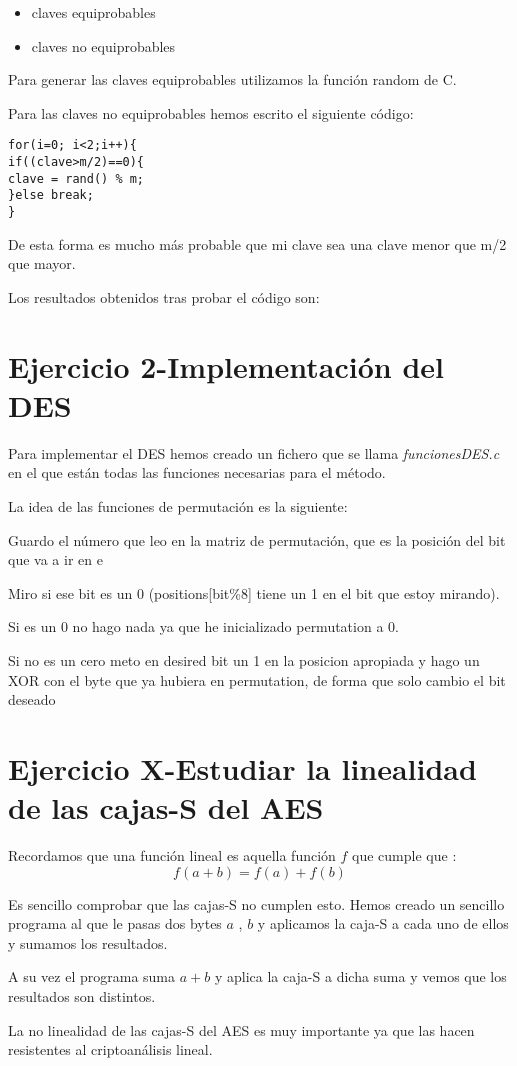 \documentclass{apuntes}
\begin{document}
\begin{itemize}
	\item claves equiprobables
	\item claves no equiprobables
\end{itemize}

Para generar las claves equiprobables utilizamos la función random de C.

Para las claves no equiprobables hemos escrito el siguiente código:


\begin{lstlisting}
for(i=0; i<2;i++){
if((clave>m/2)==0){
clave = rand() % m;
}else break;
}
\end{lstlisting}



De esta forma es mucho más probable que mi clave sea una clave menor que m/2 que mayor. 


Los resultados obtenidos tras probar el código son:



\section{Ejercicio 2-Implementación del DES}

Para implementar el DES hemos creado un fichero que se llama \textit{funcionesDES.c} en el que están todas las funciones necesarias para el método.

La idea de las funciones de permutación es la siguiente:

Guardo el número que leo en la matriz de permutación, que es la posición del bit que va a ir en e 

Miro si ese bit es un 0 (positions[bit\%8] tiene un 1 en el bit que estoy mirando).

Si es un 0 no hago nada ya que he inicializado permutation a 0.

Si no es un cero meto en desired bit un 1 en la posicion apropiada y hago un 
XOR con el byte que ya hubiera en permutation, de forma que solo cambio el bit deseado


\section{Ejercicio X-Estudiar la linealidad de las cajas-S del AES}

Recordamos que una función lineal es aquella función $f$ que cumple que :
$$f(a + b) = f(a) + f(b)$$

Es sencillo comprobar que las cajas-S no cumplen esto. Hemos creado un sencillo programa al que le pasas dos bytes $a$ , $b$ y aplicamos la caja-S a cada uno de ellos y sumamos los resultados.

A su vez el programa suma $a + b$ y aplica la caja-S a dicha suma y vemos que los resultados son distintos.

La no linealidad de las cajas-S del AES es muy importante ya que las hacen resistentes al criptoanálisis lineal.

\printindex
\end{document}
